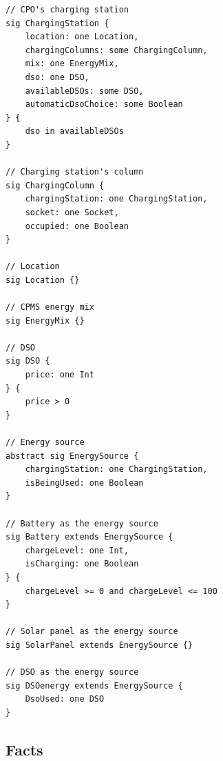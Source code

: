 \begin{verbatim}
// CPO's charging station
sig ChargingStation {
    location: one Location,
    chargingColumns: some ChargingColumn,
    mix: one EnergyMix,
    dso: one DSO,
    availableDSOs: some DSO,
    automaticDsoChoice: some Boolean
} {
    dso in availableDSOs
}

// Charging station's column
sig ChargingColumn {
    chargingStation: one ChargingStation,
    socket: one Socket,
    occupied: one Boolean
}

// Location
sig Location {}

// CPMS energy mix
sig EnergyMix {}

// DSO
sig DSO {
    price: one Int
} {
    price > 0
}

// Energy source
abstract sig EnergySource {
    chargingStation: one ChargingStation,
    isBeingUsed: one Boolean
}

// Battery as the energy source
sig Battery extends EnergySource {
    chargeLevel: one Int,
    isCharging: one Boolean
} {
    chargeLevel >= 0 and chargeLevel <= 100
}

// Solar panel as the energy source
sig SolarPanel extends EnergySource {}

// DSO as the energy source
sig DSOenergy extends EnergySource {
    DsoUsed: one DSO
}
\end{verbatim}

\pagebreak

\subsection{Facts}

